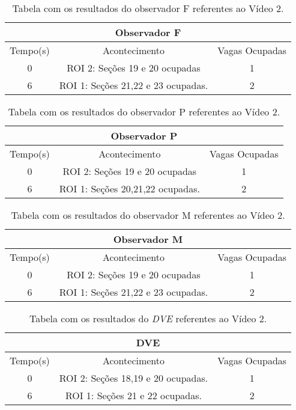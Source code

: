 \begin{table}[H]
\begin{center}
\begin{tabular}{|c||c||c|}
\hline
\multicolumn{3}{|c|}{Observador F}  \\ \hline \hline
Tempo(s) & Acontecimento & Vagas Ocupadas\\ \hline
0 & ROI 2: Seções 19 e 20 ocupadas & 1 \\ \hline
6 & ROI 1: Seções 21,22 e 23 ocupadas. & 2 \\
\hline
\end{tabular}
\end{center}
\caption{Tabela com os resultados do observador F referentes ao Vídeo 2.}
\label{tab:video2F}
\end{table}

\begin{table}[H]
\begin{center}
\begin{tabular}{|c||c||c|}
\hline
\multicolumn{3}{|c|}{Observador P}  \\ \hline \hline
Tempo(s) & Acontecimento & Vagas Ocupadas\\ \hline
0 & ROI 2: Seções 19 e 20 ocupadas  & 1\\ \hline
6 & ROI 1: Seções 20,21,22 ocupadas. & 2 \\
\hline
\end{tabular}
\end{center}
\caption{Tabela com os resultados do observador P referentes ao Vídeo 2.}
\label{tab:video2M}
\end{table}


\begin{table}[H]
\begin{center}
\begin{tabular}{|c||c||c|}
\hline
\multicolumn{3}{|c|}{Observador M}  \\ \hline \hline
Tempo(s) & Acontecimento & Vagas Ocupadas\\ \hline
0 & ROI 2: Seções 19 e 20 ocupadas & 1\\ \hline
6 & ROI 1: Seções 21,22 e 23 ocupadas. & 2\\
\hline
\end{tabular}
\end{center}
\caption{Tabela com os resultados do observador M referentes ao Vídeo 2.}
\label{tab:video2P}
\end{table}


\begin{table}[H]
\begin{center}
\begin{tabular}{|c||c||c|}
\hline
\multicolumn{3}{|c|}{DVE}  \\ \hline \hline
Tempo(s) & Acontecimento & Vagas Ocupadas\\ \hline
0 & ROI 2: Seções 18,19 e 20 ocupadas. & 1 \\ \hline
6 & ROI 1: Seções 21 e 22 ocupadas. & 2 \\
\hline
\end{tabular}
\end{center}
\caption{Tabela com os resultados do \textit{DVE} referentes ao Vídeo 2.}
\label{tab:video2}
\end{table}


